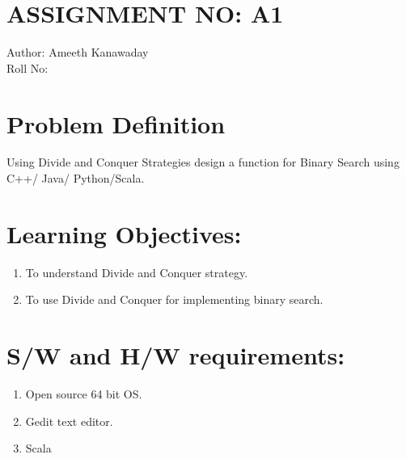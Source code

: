 \documentclass{article}
\begin{document}
\section{ASSIGNMENT NO: A1}
Author:\:   Ameeth Kanawaday\\
Roll No:\\

\section{Problem Definition}
Using Divide and Conquer Strategies design a function for Binary Search using C++/ Java/ Python/Scala.

\section{Learning Objectives:}
\begin{enumerate}
\item To understand Divide and Conquer strategy.
\item To use Divide and Conquer for implementing binary search.
\end{enumerate}

\section{S/W and H/W requirements:}
\begin{enumerate}
\item Open source 64 bit OS.
\item Gedit text editor.
\item Scala
\end{enumerate}
\end{document}
